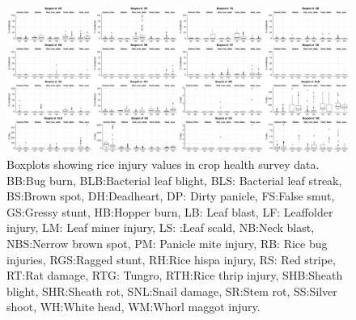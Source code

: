 \begin{landscape}
\begin{figure}[!h]
\centering
\includegraphics[height = 1\textheight]{figures/boxplot1/boxplot1.pdf}
\caption{Boxplots showing  rice injury values in crop health survey data. BB:Bug burn, BLB:Bacterial leaf blight, BLS: Bacterial leaf streak, BS:Brown spot, DH:Deadheart, DP: Dirty panicle, FS:False smut, GS:Gressy stunt, HB:Hopper burn, LB: Leaf blast, LF: Leaffolder injury, LM: Leaf miner injury, LS: :Leaf scald, NB:Neck blast, NBS:Nerrow brown spot, PM: Panicle mite injury, RB: Rice bug injuries, RGS:Ragged stunt, RH:Rice hispa injury, RS: Red stripe, RT:Rat damage, RTG: Tungro, RTH:Rice thrip injury, SHB:Sheath blight, SHR:Sheath rot, SNL:Snail damage, SR:Stem rot, SS:Silver shoot, WH:White head, WM:Whorl maggot injury.}
\label{fig:boxplot1}
\end{figure}
\end{landscape}

